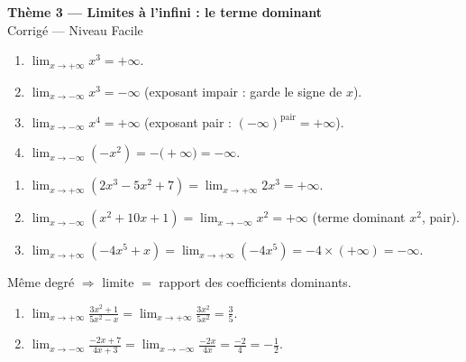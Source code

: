 \documentclass[11pt,a4paper]{article}
\begin{document}
\begin{center}
{\Large\bfseries\color{primarydark}Thème 3 — Limites à l'infini : le terme dominant}\\[2pt]
{\large\color{excol}Corrigé — Niveau Facile}
\end{center}
\vspace{6pt}

\begin{correction}
\begin{enumerate}[label=\alph*),leftmargin=2em,itemsep=3pt]
  \item $\displaystyle\lim_{x\to+\infty} x^3=+\infty$.
  \item $\displaystyle\lim_{x\to-\infty} x^3=-\infty$ (exposant impair : garde le signe de $x$).
  \item $\displaystyle\lim_{x\to-\infty} x^4=+\infty$ (exposant pair : $(-\infty)^{\text{pair}}=+\infty$).
  \item $\displaystyle\lim_{x\to-\infty} (-x^2)=-\bigl(+\infty\bigr)=-\infty$.
\end{enumerate}
\end{correction}

\begin{correction}
\begin{enumerate}[label=\alph*),leftmargin=2em,itemsep=3pt]
  \item $\displaystyle\lim_{x\to+\infty}(2x^3-5x^2+7)=\lim_{x\to+\infty}2x^3=+\infty$.
  \item $\displaystyle\lim_{x\to-\infty}(x^2+10x+1)=\lim_{x\to-\infty}x^2=+\infty$ (terme dominant $x^2$, pair).
  \item $\displaystyle\lim_{x\to+\infty}(-4x^5+x)=\lim_{x\to+\infty}(-4x^5)=-4\times(+\infty)=-\infty$.
\end{enumerate}
\end{correction}

\begin{correction}
Même degré $\Rightarrow$ limite $=$ rapport des coefficients dominants.
\begin{enumerate}[label=\alph*),leftmargin=2em,itemsep=3pt]
  \item $\displaystyle\lim_{x\to+\infty}\frac{3x^2+1}{5x^2-x}=\lim_{x\to+\infty}\frac{3x^2}{5x^2}=\frac{3}{5}$.
  \item $\displaystyle\lim_{x\to-\infty}\frac{-2x+7}{4x+3}=\lim_{x\to-\infty}\frac{-2x}{4x}=\frac{-2}{4}=-\frac12$.
\end{enumerate}
\end{correction}
\end{document}
